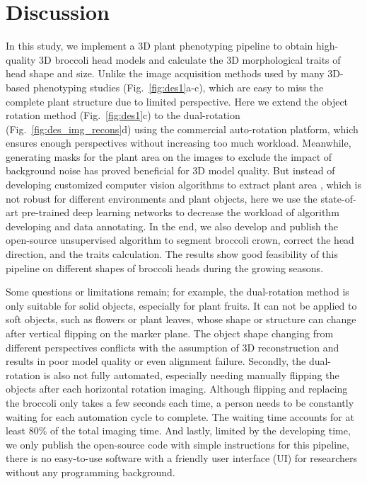

\section{Discussion}

In this study, we implement a 3D plant phenotyping pipeline to obtain high-quality 3D broccoli head models and calculate the 3D morphological traits of head shape and size. Unlike the image acquisition methods used by many 3D-based phenotyping studies (Fig.~\ref{fig:des1}a-c), which are easy to miss the complete plant structure due to limited perspective. Here we extend the object rotation method (Fig.~\ref{fig:des1}c) to the dual-rotation (Fig.~\ref{fig:des_img_recons}d) using the commercial auto-rotation platform, which ensures enough perspectives without increasing too much workload. Meanwhile, generating masks for the plant area on the images to exclude the impact of background noise has proved beneficial for 3D model quality. But instead of developing customized computer vision algorithms to extract plant area \citep{nguyen_3d_2016,kochi_3d_2018,kochi_all_2022}, which is not robust for different environments and plant objects, here we use the state-of-art pre-trained deep learning networks to decrease the workload of algorithm developing and data annotating. In the end, we also develop and publish the open-source unsupervised algorithm to segment broccoli crown, correct the head direction, and the traits calculation. The results show good feasibility of this pipeline on different shapes of broccoli heads during the growing seasons. 

Some questions or limitations remain; for example, the dual-rotation method is only suitable for solid objects, especially for plant fruits. It can not be applied to soft objects, such as flowers or plant leaves, whose shape or structure can change after vertical flipping on the marker plane. The object shape changing from different perspectives conflicts with the assumption of 3D reconstruction and results in poor model quality or even alignment failure. Secondly, the dual-rotation is also not fully automated, especially needing manually flipping the objects after each horizontal rotation imaging. Although flipping and replacing the broccoli only takes a few seconds each time, a person needs to be constantly waiting for each automation cycle to complete. The waiting time accounts for at least 80\% of the total imaging time. And lastly, limited by the developing time, we only publish the open-source code with simple instructions for this pipeline, there is no easy-to-use software with a friendly user interface (UI) for researchers without any programming background.

